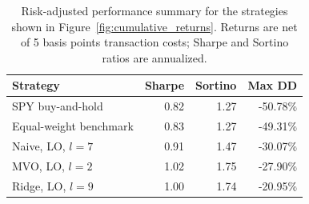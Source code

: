 \begin{table}[htbp]
\centering
\caption{Risk-adjusted performance summary for the strategies shown in Figure~\ref{fig:cumulative_returns}. Returns are net of 5 basis points transaction costs; Sharpe and Sortino ratios are annualized.}
\label{tab:strategy_performance}
\begin{tabular}{lrrr}
\toprule
Strategy & Sharpe & Sortino & Max DD \\
\midrule
SPY buy-and-hold & 0.82 & 1.27 & -50.78\% \\
Equal-weight benchmark & 0.83 & 1.27 & -49.31\% \\
Naive, LO, $l=7$ & 0.91 & 1.47 & -30.07\% \\
MVO, LO, $l=2$ & 1.02 & 1.75 & -27.90\% \\
Ridge, LO, $l=9$ & 1.00 & 1.74 & -20.95\% \\
\bottomrule
\end{tabular}
\end{table}
